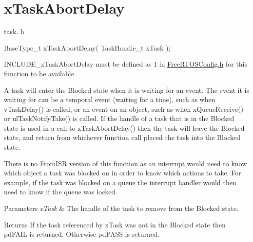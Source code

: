 \hypertarget{group__x_task_abort_delay}{}\section{x\+Task\+Abort\+Delay}
\label{group__x_task_abort_delay}
task. h 
\begin{DoxyPre}BaseType\_t xTaskAbortDelay( TaskHandle\_t xTask );\end{DoxyPre}


I\+N\+C\+L\+U\+D\+E\+\_\+x\+Task\+Abort\+Delay must be defined as 1 in \mbox{\hyperlink{_free_r_t_o_s_config_8h_source}{Free\+R\+T\+O\+S\+Config.\+h}} for this function to be available.

A task will enter the Blocked state when it is waiting for an event. The event it is waiting for can be a temporal event (waiting for a time), such as when v\+Task\+Delay() is called, or an event on an object, such as when x\+Queue\+Receive() or ul\+Task\+Notify\+Take() is called. If the handle of a task that is in the Blocked state is used in a call to x\+Task\+Abort\+Delay() then the task will leave the Blocked state, and return from whichever function call placed the task into the Blocked state.

There is no \textquotesingle{}From\+I\+SR\textquotesingle{} version of this function as an interrupt would need to know which object a task was blocked on in order to know which actions to take. For example, if the task was blocked on a queue the interrupt handler would then need to know if the queue was locked.


\begin{DoxyParams}{Parameters}
{\em x\+Task} & The handle of the task to remove from the Blocked state.\\
\hline
\end{DoxyParams}
\begin{DoxyReturn}{Returns}
If the task referenced by x\+Task was not in the Blocked state then pd\+F\+A\+IL is returned. Otherwise pd\+P\+A\+SS is returned. 
\end{DoxyReturn}
